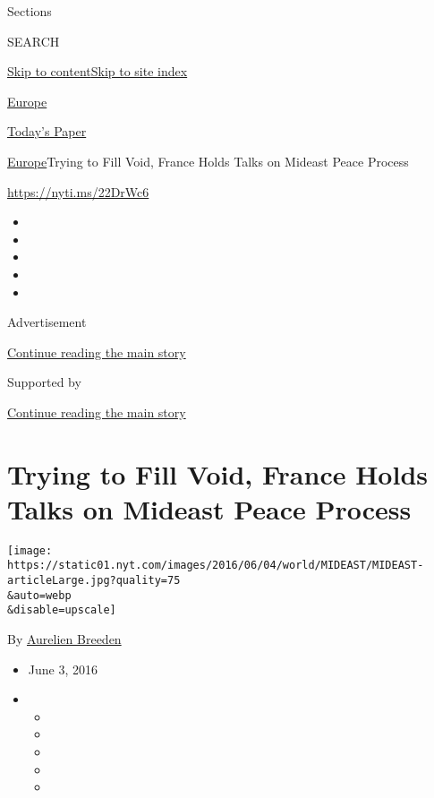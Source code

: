 Sections

SEARCH

\protect\hyperlink{site-content}{Skip to
content}\protect\hyperlink{site-index}{Skip to site index}

\href{https://www.nytimes.com/section/world/europe}{Europe}

\href{https://myaccount.nytimes.com/auth/login?response_type=cookie\&client_id=vi}{}

\href{https://www.nytimes.com/section/todayspaper}{Today's Paper}

\href{/section/world/europe}{Europe}\textbar{}Trying to Fill Void,
France Holds Talks on Mideast Peace Process

\url{https://nyti.ms/22DrWc6}

\begin{itemize}
\item
\item
\item
\item
\item
\end{itemize}

Advertisement

\protect\hyperlink{after-top}{Continue reading the main story}

Supported by

\protect\hyperlink{after-sponsor}{Continue reading the main story}

\hypertarget{trying-to-fill-void-france-holds-talks-on-mideast-peace-process}{%
\section{Trying to Fill Void, France Holds Talks on Mideast Peace
Process}\label{trying-to-fill-void-france-holds-talks-on-mideast-peace-process}}

\texttt{[image: https://static01.nyt.com/images/2016/06/04/world/MIDEAST/MIDEAST-articleLarge.jpg?quality=75\\\&auto=webp\\\&disable=upscale]}

By \href{https://www.nytimes.com/by/aurelien-breeden}{Aurelien Breeden}

\begin{itemize}
\item
  June 3, 2016
\item
  \begin{itemize}
  \item
  \item
  \item
  \item
  \item
  \end{itemize}
\end{itemize}

